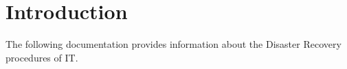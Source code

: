 \section{Introduction}

The following documentation provides information about the Disaster Recovery procedures of IT.
